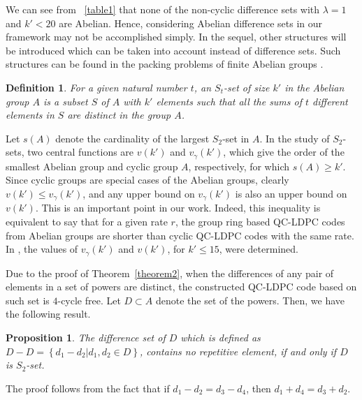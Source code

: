 \documentclass[journal,draftclsnofoot,onecolumn,12pt,twoside]{IEEEtran}
\newtheorem{Proposition}{Proposition}
\newtheorem{Definition}{Definition}
\begin{document}
We can see from \tablename~\ref{table1} that none of the non-cyclic difference sets with $\lambda=1$ and $k'<20$ are Abelian. Hence, considering Abelian difference sets in our framework may not be accomplished simply. In the sequel, other structures will be introduced  which can be taken into account instead of difference sets. Such structures can be found in the packing problems of  finite Abelian groups \cite{18,19}.
\begin{Definition}
For a given natural number $t$, an $S_t$-set of size $k'$ in the Abelian group $A$ is a subset $S$ of $A$ with $k'$ elements such that all the sums of $t$ different elements in $S$ are distinct in the group $A$.
\end{Definition}

Let $s(A)$ denote the cardinality of the largest $S_2$-set in $A$.  In the study of $S_2$-sets, two central functions are $v(k')$ and $v_{\gamma}(k')$, which give the order of the smallest Abelian group and cyclic group $A$, respectively, for which $s(A)\geq k'$. Since cyclic groups are special cases of the Abelian groups, clearly $v(k') \leq v_{\gamma}(k')$, and any upper bound on $v_{\gamma}(k')$  is also an upper bound on $v(k')$. This is an important point in our work. Indeed, this inequality is equivalent to say that for a given rate $r$, the group ring based QC-LDPC codes from Abelian groups are shorter than cyclic QC-LDPC codes with the same rate. In \cite{18,19}, the values of $v_{\gamma}(k')$ and $v(k')$, for $k' \leq 15$, were determined.


Due to the proof of Theorem~\ref{theorem2}, when the differences of any pair of elements in a set of powers are distinct,  the constructed QC-LDPC code based on such set is $4$-cycle free. Let $D\subset A$ denote the set of the powers. Then, we have the following result.
\begin{Proposition}\label{prop1}
The difference set of $D$ which is defined as $D-D=\left\lbrace d_1-d_2 |d_1,d_2\in D \right\rbrace$, contains no repetitive element, if and only if $D$ is $S_2$-set.
\end{Proposition}
\begin{IEEEproof}
The proof follows from the fact that if $d_1-d_2=d_3-d_4$, then $d_1+d_4=d_3+d_2$.
\end{IEEEproof}
\end{document}
